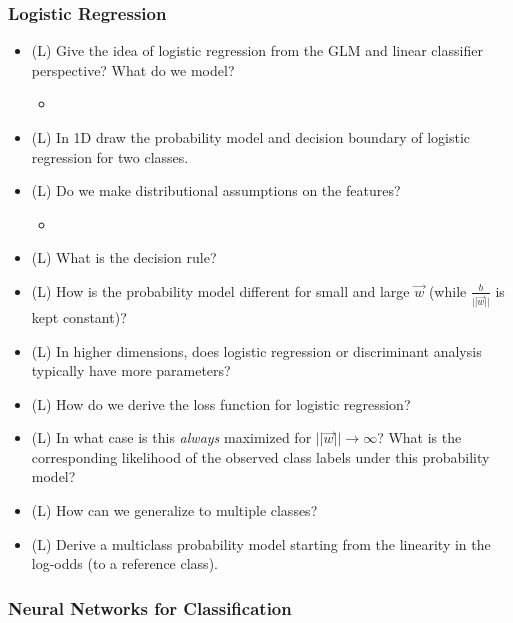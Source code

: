 \subsubsection*{Logistic Regression}
\begin{itemize}
    \item (L) Give the idea of logistic regression from the GLM and linear classifier perspective? What do we model?
    \begin{itemize}
        \item {}
    \end{itemize}
    \answerboxL
    \item (L) In 1D draw the probability model and decision boundary of logistic regression for two classes.
    \answerboxM
    \item (L) Do we make distributional assumptions on the features?
    \begin{itemize}
        \item {}
    \end{itemize}
    \answerboxM
    \item (L) What is the decision rule?
    \answerboxM
    \item (L) How is the probability model different for small and large $\vec{w}$ (while $\frac{b}{||\vec{w}||}$ is kept constant)?
    \answerboxM
    \item (L) In higher dimensions, does logistic regression or discriminant analysis typically have more parameters?
    \answerboxS
    \item (L) How do we derive the loss function for logistic regression?
    \answerboxM
    \item (L) In what case is this \textit{always} maximized for $||\vec{w}|| \rightarrow \infty$? What is the corresponding likelihood of the observed class labels under this probability model?
    \answerboxM
    \item (L) How can we generalize to multiple classes?
    \answerboxM
    \item (L) Derive a multiclass probability model starting from the linearity in the log-odds (to a reference class).
    \answerboxM
\end{itemize}

\subsubsection*{Neural Networks for Classification}


